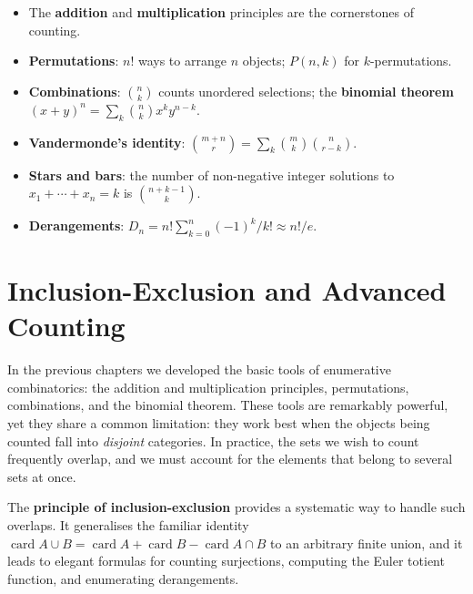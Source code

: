 \documentclass[12pt,a4paper,openany]{book}
\theoremstyle{definition}
\theoremstyle{plain}
\theoremstyle{remark}
\DeclareMathOperator{\card}{card}
\begin{document}
\begin{itemize}[nosep]
  \item The \textbf{addition} and
    \textbf{multiplication} principles are
    the cornerstones of counting.
  \item \textbf{Permutations}: $n!$ ways to arrange $n$
    objects; $P(n,k)$ for $k$-permutations.
  \item \textbf{Combinations}: $\binom{n}{k}$ counts
    unordered selections; the \textbf{binomial theorem}
    $(x+y)^n = \sum_k \binom{n}{k}x^k y^{n-k}$.
  \item \textbf{Vandermonde's identity}:
    $\binom{m+n}{r} = \sum_k \binom{m}{k}\binom{n}{r-k}$.
  \item \textbf{Stars and bars}: the number of
    non-negative integer solutions to $x_1 + \cdots + x_n = k$ is
    $\binom{n+k-1}{k}$.
  \item \textbf{Derangements}: $D_n = n!\sum_{k=0}^{n}(-1)^k/k!
    \approx n!/e$.
\end{itemize}



\chapter{Inclusion-Exclusion and Advanced Counting}\label{ch:inclusion-exclusion}


In the previous chapters we developed the basic tools of enumerative
combinatorics: the addition and multiplication principles, permutations,
combinations, and the binomial theorem.  These tools are remarkably
powerful, yet they share a common limitation: they work best when the
objects being counted fall into \emph{disjoint} categories.  In
practice, the sets we wish to count frequently overlap, and we must
account for the elements that belong to several sets at once.

The \textbf{principle of inclusion-exclusion}
provides a systematic way to handle such overlaps.  It generalises the
familiar identity $\card{A \cup B} = \card{A} + \card{B} - \card{A \cap B}$
to an arbitrary finite union, and it leads to elegant formulas for
counting surjections, computing the Euler totient function, and
enumerating derangements.
\end{document}
